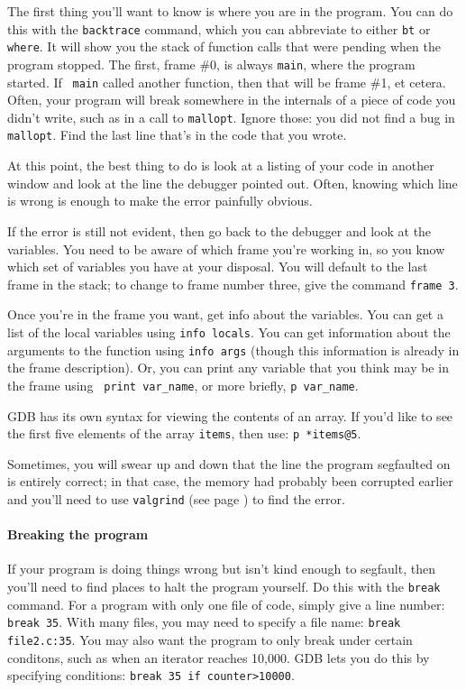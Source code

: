 \documentclass[12pt]{article}
\begin{document}
The first thing you'll want to know is where you are in the program. You
can do this with the {\tt backtrace} command, which you can abbreviate to
either {\tt bt} or {\tt where}. It will show you the stack of function
calls that were pending when the program stopped.  The first, frame
\#0, is always {\tt main}, where the program started. If {\tt
main} called another function, then that will be frame \#1, et cetera.
Often, your program will break somewhere in the internals of a piece of
code you didn't write, such as in a call to {\tt mallopt}. Ignore those:
you did not find a bug in {\tt mallopt}. Find the last line that's in
the code that you wrote.

At this point, the best thing to do is look at a listing of your code
in another window and look at the line the debugger pointed out. Often,
knowing which line is wrong is enough to make the error painfully obvious.

If the error is still not evident, then go back to the debugger and look
at the variables. You need to be aware of which frame you're working in,
so you know which set of variables you have at your disposal.  You
will default to the last frame in the stack; to change to frame number
three, give the command {\tt frame 3}.

Once you're in the frame you want, get info about the variables. You can
get a list of the local variables using {\tt info locals}. You can get
information about the arguments to the function using {\tt info args}
(though this information is already in the frame description). Or, you
can print any variable that you think may be in the frame using {\tt
print var\_name}, or more briefly, {\tt p var\_name}. 

GDB has its own syntax for viewing the contents of an array. If you'd
like to see the first five elements of the array {\tt items}, then use:
{\tt p *items@5}.

Sometimes, you will swear up and down that the line the program segfaulted on is
entirely correct; in that case, the memory had probably been corrupted earlier and
you'll need to use {\tt valgrind} (see page \pageref{valgrind}) to find the error.

\paragraph{Breaking the program} If your program is doing things wrong but isn't kind
enough to segfault, then you'll need to find places to halt the program
yourself. Do this with the {\tt break} command. For a program with only
one file of code, simply give a line number: {\tt break 35}. With many
files, you may need to specify a file name: {\tt break file2.c:35}. You
may also want the program to only break under certain conditons, such
as when an iterator reaches 10,000. GDB lets you do this by specifying
conditions: {\tt break 35 if counter>10000}.
\end{document}
